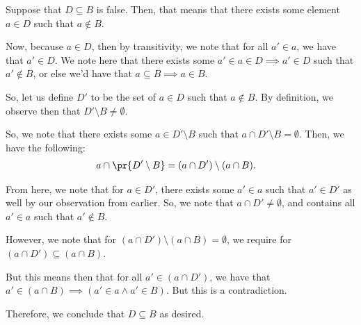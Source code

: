 \documentclass{article}
\begin{document}
\begin{solution}
\begin{comment}
	Furthermore, we note that we must also have that $a \subseteq B$ so that $a \cap (D \setminus B) = \emptyset$.
	
	However, we note that by our assumption, we have then that $a \subseteq B \implies a \in B$. But we assumed that $a \in (D \setminus B)$, meaning that $a \not\in B$. Thus, we have a contradiction.
	
	So, we conclude that we must have $D \subseteq B$ as desired.
	\end{comment}
	Suppose that $D \subseteq B$ is false. Then, that means that there exists some element $a \in D$ such that $a \not\in B$.
	
	Now, because $a \in D$, then by transitivity, we note that for all $a' \in a$, we have that $a' \in D$. We note here that there exists some $a' \in a \in D \implies a' \in D$ such that $a' \not\in B$, or else we'd have that $a \subseteq B \implies a \in B$.
	
	So, let us define $D'$ to be the set of $a \in D$ such that $a \not\in B$. By definition, we observe then that $D' \setminus B \neq \emptyset$.
	
	\begin{comment}
		Furthermore, we note that $D'$ is in fact transitive: suppose $a \in D'$ and $a' \in a$. Since $a \in D'$, we note then that $a \in D$ and $a \not\in B$. Then, for $a \not\subseteq B$, there exists some $a' \in a$ such that $a' \not\in B$. We note that $a' \in D$ as well by transitivity of $D$, and thus we see that $a' \in D'$ as well.
	\end{comment}
	So, we note that there exists some $a \in D' \setminus B$ such that $a \cap D' \setminus B = \emptyset$. Then, we have the following:
	\begin{align*}
		a \cap \pr{D' \setminus B} &= (a \cap D') \setminus (a \cap B).
	\end{align*}

	From here, we note that for $a \in D'$, there exists some $a' \in a$ such that $a' \in D'$ as well by our observation from earlier. So, we note that $a \cap D' \neq \emptyset$, and contains all $a' \in a$ such that $a' \not\in B$.
	
	However, we note that for $(a \cap D') \setminus (a \cap B) = \emptyset$, we require for $(a \cap D') \subseteq (a \cap B)$.
	
	But this means then that for all $a' \in (a \cap D')$, we have that $a' \in (a \cap B) \implies (a' \in a \land a' \in B)$. But this is a contradiction.
	
	Therefore, we conclude that $D \subseteq B$ as desired.
\end{solution}
\end{document}
